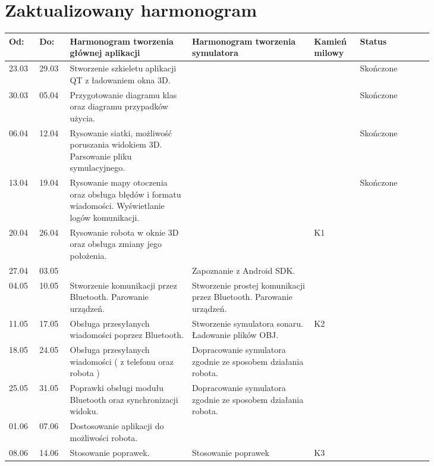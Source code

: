 \documentclass[a4paper,12pt]{article}
\begin{document}
\section{Zaktualizowany harmonogram}
\begin{longtable}{|p{0.05\linewidth}|p{0.05\linewidth}||p{0.25\linewidth}|p{0.25\linewidth}||p{0.08\linewidth}||p{0.15\linewidth}| }
\hline
\textbf{Od:} & \textbf{Do:} & \textbf{Harmonogram tworzenia głównej aplikacji} & \textbf{Harmonogram tworzenia symulatora} & \textbf{Kamień milowy} & \textbf{Status}\\ \hline \hline
23.03 & 29.03 & Stworzenie szkieletu aplikacji QT z ładowaniem okna 3D. & & & Skończone \\ \hline
30.03 & 05.04 & Przygotowanie diagramu klas oraz diagramu przypadków użycia. & & & Skończone \\ \hline
06.04 & 12.04 & Rysowanie siatki, możliwość poruszania widokiem 3D. Parsowanie pliku symulacyjnego. & & & Skończone\\ \hline
13.04 & 19.04 & Rysowanie mapy otoczenia oraz obsługa błędów i formatu wiadomości. Wyświetlanie logów komunikacji. & & & Skończone \\ \hline
20.04 & 26.04 & Rysowanie robota w oknie 3D oraz obsługa zmiany jego położenia. & & K1 & \\ \hline \hline
27.04 & 03.05 & & Zapoznanie z Android SDK. & & \\ \hline
04.05 & 10.05 & Stworzenie komunikacji przez Bluetooth. Parowanie urządzeń. & Stworzenie prostej komunikacji przez Bluetooth. Parowanie urządzeń. & & \\ \hline
11.05 & 17.05 & Obsługa przesyłanych wiadomości poprzez Bluetooth. & Stworzenie symulatora sonaru. Ładowanie plików OBJ. & K2 & \\ \hline \hline
18.05 & 24.05 & Obsługa przesyłanych wiadomości ( z telefonu oraz robota ) & Dopracowanie symulatora zgodnie ze sposobem działania robota. & & \\ \hline
25.05 & 31.05 & Poprawki obsługi modułu Bluetooth oraz synchronizacji widoku. & Dopracowanie symulatora zgodnie ze sposobem działania robota. & & \\ \hline
01.06 & 07.06 & Dostosowanie aplikacji do możliwości robota. & & & \\ \hline
08.06 & 14.06 & Stosowanie poprawek. & Stosowanie poprawek & K3 & \\ \hline
\end{longtable}
\end{document}
